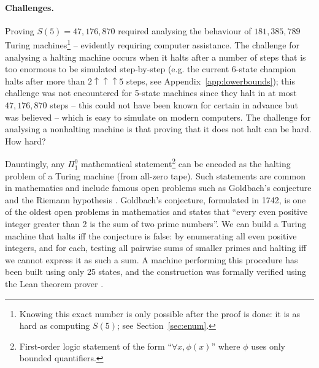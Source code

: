 \documentclass[letterpaper,british,11pt]{article}
\theoremstyle{definition} %
\numberwithin{equation}{section}
\theoremstyle{definition} %
\newcommand{\BBtheFifth}{47{,}176{,}870}
\newcommand{\BBtheFifthTNF}{181{,}385{,}789}
\begin{document}
\vspace{-2ex}
\paragraph{Challenges.} Proving $S(5) = \BBtheFifth$ required analysing the behaviour of $\BBtheFifthTNF$ Turing machines\footnote{Knowing this exact number is only possible after the proof is done: it is as hard as computing $S(5)$; see Section~\ref{sec:enum}.} -- evidently requiring computer assistance. The challenge for analysing a halting machine occurs when it halts after a number of steps that is too enormous to be simulated step-by-step (e.g. the current 6-state champion halts after more than $2 \uparrow \uparrow \uparrow 5$ steps, see Appendix~\ref{app:lowerbounds}); this challenge was not encountered for 5-state machines since they halt in at most $\BBtheFifth$ steps -- this could not have been known for certain in advance but was believed -- which is easy to simulate on modern computers. The challenge for analysing a nonhalting machine is that proving that it does not halt can be hard. How hard?

Dauntingly, any $\Pi_1^0$ mathematical statement\footnote{First-order logic statement of the form ``$\forall x, \phi(x)$'' where $\phi$ uses only bounded quantifiers.} can be encoded as the halting problem of a Turing machine (from all-zero tape). Such statements are common in mathematics and include famous open problems such as Goldbach's conjecture and the Riemann hypothesis \cite{Davis-Matiyasevich-Robinson-1976}. Goldbach's conjecture, formulated in 1742, is one of the oldest open problems in mathematics and states that ``every even positive integer greater than 2 is the sum of two prime numbers''. We can build a Turing machine that halts iff the conjecture is false: by enumerating all even positive integers, and for each, testing all pairwise sums of smaller primes and halting iff we cannot express it as such a sum. A machine performing this procedure has been built using only 25 states, and the construction was formally verified using the Lean theorem prover \cite{GoldbachTM27, GoldbachTM25, DeMouraKongAvigadVanDoornvonRaumer}.
\end{document}
